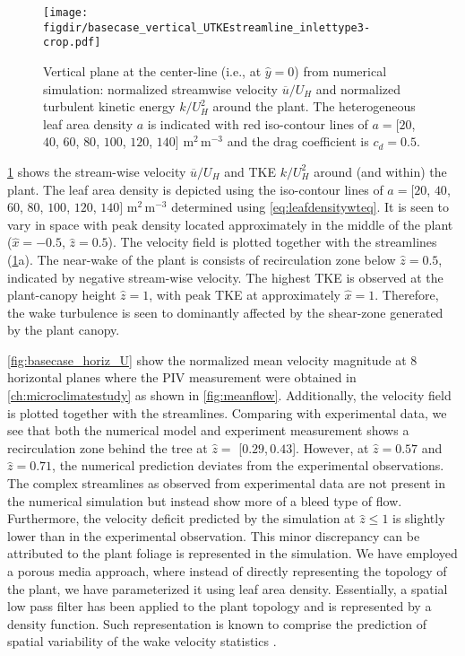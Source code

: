\begin{figure}[t]
	\centering
	\texttt{[image: \\figdir/basecase\_vertical\_UTKEstreamline\_inlettype3-crop.pdf]}
	\caption{Vertical plane at the center-line (i.e., at $\hat{y}=0$) from numerical simulation:  normalized  streamwise velocity $\overline{u}/U_H$ and  normalized  turbulent kinetic energy $k/U_H^2$ around the plant. The heterogeneous leaf area density $a$ is indicated with red iso-contour lines of $a = [20$, $40$, $60$, $80$, $100$, $120$, $140]$ m$^2$\,m$^{-3}$ and the drag coefficient is $c_d=0.5$.}
	\label{fig:basecase_vertical_UTKEstreamline}
\end{figure}

\cref{fig:basecase_vertical_UTKEstreamline} shows the stream-wise velocity $\overline{u}/U_H$ and TKE $k/U_H^2$ around (and within) the plant. The leaf area density is depicted using the iso-contour lines of $a = [20$, $40$, $60$, $80$, $100$, $120$, $140]$ m$^2$\,m$^{-3}$ determined using \cref{eq:leafdensitywteq}. It is seen to vary in space with peak density located approximately in the middle of the plant ($\hat{x}=-0.5$, $\hat{z}=0.5$). The velocity field is plotted together with the streamlines (\cref{fig:basecase_vertical_UTKEstreamline}a). The near-wake of the plant is consists of recirculation zone below $\hat{z} = 0.5$, indicated by negative stream-wise velocity. The highest TKE is observed at the plant-canopy height $\hat{z} = 1$, with peak TKE at approximately $\hat{x} = 1$. Therefore, the wake turbulence is seen to dominantly affected by the shear-zone generated by the plant canopy.

\cref{fig:basecase_horiz_U} show the normalized mean velocity magnitude at 8 horizontal planes where the PIV measurement were obtained in \cref{ch:microclimatestudy} as shown in \cref{fig:meanflow}. Additionally, the velocity field is plotted together with the streamlines. Comparing with experimental data, we see that both the numerical model and experiment measurement shows a recirculation zone behind the tree at $\hat{z}=$ [$0.29$,\,$0.43$]. However, at $\hat{z}= 0.57$ and $\hat{z}=0.71$, the numerical prediction deviates from the experimental observations. The complex streamlines as observed from experimental data are not present in the numerical simulation but instead show more of a bleed type of flow. Furthermore, the velocity deficit predicted by the simulation at $\hat{z}\le 1$ is slightly lower than in the experimental observation. This minor discrepancy can be attributed to the plant foliage is represented in the simulation. We have employed a porous media approach, where instead of directly representing the topology of the plant, we have parameterized it using leaf area density. Essentially, a spatial low pass filter has been applied to the plant topology and is represented by a density function. Such representation is known to comprise the prediction of spatial variability of the wake velocity statistics \citep{Endalew2009}.  

